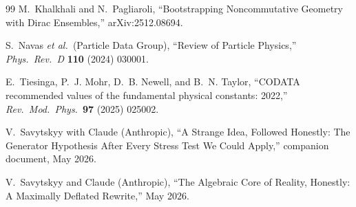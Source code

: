 \documentclass[11pt,a4paper]{article}
\begin{document}
\begin{thebibliography}{99}
M.~Khalkhali and N.~Pagliaroli, ``Bootstrapping Noncommutative Geometry with
Dirac Ensembles,'' arXiv:2512.08694.

S.~Navas \emph{et al.\ }(Particle Data Group),
``Review of Particle Physics,'' \emph{Phys.\ Rev.\ D} \textbf{110} (2024) 030001.

E.~Tiesinga, P.~J. Mohr, D.~B. Newell, and B.~N. Taylor, ``CODATA recommended
values of the fundamental physical constants: 2022,''
\emph{Rev.\ Mod.\ Phys.}\ \textbf{97} (2025) 025002.

V.~Savytskyy with Claude (Anthropic), ``A Strange Idea, Followed Honestly:
The Generator Hypothesis After Every Stress Test We Could Apply,''
companion document, May 2026.

V.~Savytskyy and Claude (Anthropic), ``The Algebraic Core of Reality,
Honestly: A Maximally Deflated Rewrite,'' May 2026.

\end{thebibliography}
\end{document}
